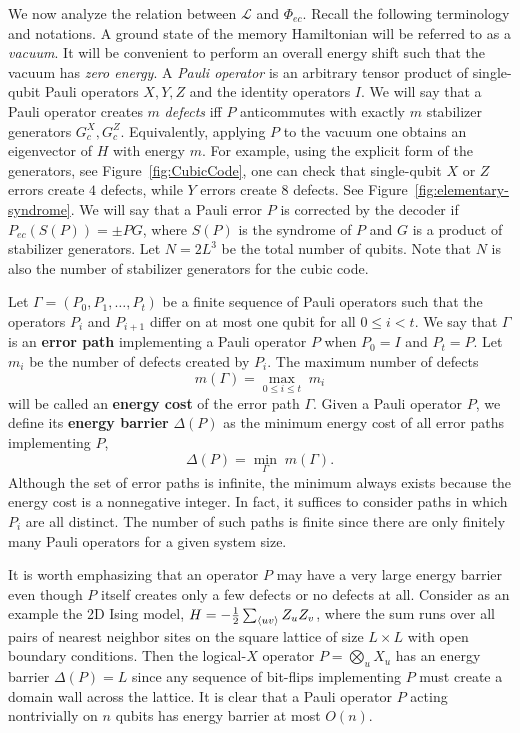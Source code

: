 We now analyze the relation between $\mathcal L$ and $\Phi_{ec}$.
Recall the following terminology and notations.
%
A ground state of the memory Hamiltonian will be referred to as a {\em vacuum}.
It will be convenient to perform an overall energy shift such that the vacuum has \emph{zero energy}.
A {\em Pauli operator} is an arbitrary tensor product of single-qubit Pauli operators
$X,Y,Z$ and the identity operators $I$. We will say that a Pauli operator creates
$m$ {\em defects} iff $P$ anticommutes with exactly $m$ stabilizer generators $G^X_c, G^Z_c$.
Equivalently, applying $P$ to the vacuum one obtains an eigenvector of $H$ with energy $m$.
For example, using the explicit form of the generators, see Figure~\ref{fig:CubicCode},
one can check that single-qubit $X$ or $Z$ errors create $4$ defects, while $Y$ errors create $8$ defects.
See Figure~\ref{fig:elementary-syndrome}.
We will say that a Pauli error $P$ is corrected by the decoder if $P_{ec}(S(P))=\pm PG$,
where $S(P)$ is the syndrome of $P$ and $G$ is a product of stabilizer generators.
Let $N=2L^3$ be the total number of qubits.
Note that $N$ is also the number of stabilizer generators for the cubic code.


Let $\Gamma=(P_0,P_1,\ldots,P_t)$ be a finite sequence of Pauli operators
such that  the operators $P_i$ and $P_{i+1}$ differ on at most one qubit
for all $0\le i <t$. 
We say that $\Gamma$ is an {\bf error path}
implementing a Pauli operator $P$ when $P_0=I$ and $P_t=P$.
Let $m_i$ be the number of defects created by $P_i$.
The maximum number of defects
\[
m(\Gamma)=\max_{0\le i\le t} \; m_i
\]
will be called an {\bf energy cost} of the error path $\Gamma$.
Given a Pauli operator $P$, we define its {\bf energy barrier} $\Delta(P)$
as the minimum energy cost of all error paths implementing $P$,
\[
\Delta(P)=\min_\Gamma \; m(\Gamma).
\]
Although the set of error paths is infinite,
the minimum always exists because the energy cost is a nonnegative integer.
In fact, it suffices to consider paths in which $P_i$ are all distinct.
The number of such paths is finite
since there are only finitely many Pauli operators for a given system size.

It is worth emphasizing that an operator $P$ may have a very large energy barrier even though
$P$ itself creates only a few defects or no defects at all.
Consider as an example the 2D Ising model, 
$H=- \frac{1}{2} \sum_{\langle u v \rangle} Z_u Z_v$, where the sum runs
over all pairs of nearest neighbor sites on the square lattice 
of size $L\times L$ with open boundary conditions.
Then the logical-$X$ operator $P=\bigotimes_u X_u$ has an energy barrier $\Delta(P)=L$ 
since any sequence of bit-flips implementing $P$ must create a domain wall across the lattice.
It is clear that a Pauli operator $P$ acting nontrivially on $n$ qubits has energy barrier at most $O(n)$.



